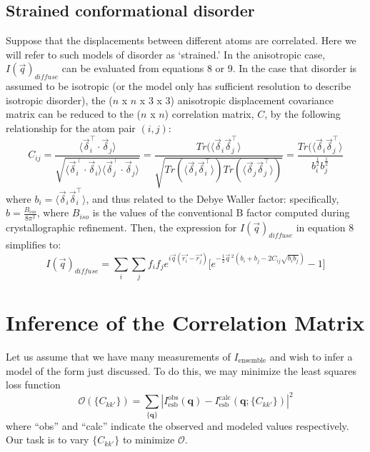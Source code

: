 \documentclass{article}
\begin{document}
\subsection{Strained conformational disorder} Suppose that the displacements between different atoms are correlated. Here we will refer to such models of disorder as `strained.' In the anisotropic case, $I(\vec{q})_{diffuse}$ can be evaluated from equations 8 or 9. In the case that disorder is assumed to be isotropic (or the model only has sufficient resolution to describe isotropic disorder), the ($n$ x $n$ x $3$ x $3$) anisotropic displacement covariance matrix can be reduced to the ($n$ x $n$) correlation matrix, $C$, by the following relationship for the atom pair $(i, j)$:
\begin{equation}
C_{ij} = \frac{ \langle \vec{\delta}_i^\intercal \cdot \vec{\delta}_j \rangle }{\sqrt{\langle \vec{\delta}_i^\intercal \cdot \vec{\delta}_i \rangle \langle \vec{\delta}_j^\intercal \cdot \vec{\delta}_j \rangle }} =\frac{Tr(\langle \vec{\delta}_i \vec{\delta}_j^\intercal \rangle}{\sqrt{Tr(\langle \vec{\delta}_i \vec{\delta}_i^\intercal \rangle)Tr(\langle \vec{\delta}_j \vec{\delta}_j^\intercal \rangle)}} = \frac{ Tr(\langle \vec{\delta}_i \vec{\delta}_j^\intercal \rangle}{b_i^{\frac{1}{2}}b_{j}^{\frac{1}{2}}}
\end{equation}
where $b_i = \langle \vec{\delta}_i \vec{\delta}_i^\intercal \rangle$, and thus related to the Debye Waller factor: specifically, $b = \frac{B_{iso}}{8\pi^2}$, where $B_{iso}$ is the values of the conventional B factor computed during crystallographic refinement. Then, the expression for $I(\vec{q})_{diffuse}$ in equation 8 simplifies to:
\begin{equation}
I(\vec{q})_{diffuse} = \sum\limits_{i}\sum\limits_{j}f_{i}f_{j}e^{i\vec{q}(\vec{r_{i}} - \vec{r_{j}})} \lbrack e^{-\frac{1}{2}\vec{q}\,^2(b_i + b_j - 2 C_{ij}\sqrt{b_i b_{j}})} - 1 \rbrack
\end{equation}

\section{Inference of the Correlation Matrix}

Let us assume that we have many measurements of $I_\mathrm{ensemble}$ and wish to infer a model of the form just discussed. To do this, we may minimize the least squares loss function
\[
\mathcal{O} ( \{ C_{kk'} \} )= \sum_{\{\mathbf{q}\}} \left| I_\mathrm{esb}^\mathrm{obs} (\mathbf{q}) 
- I_\mathrm{esb}^\mathrm{calc} (\mathbf{q}; \{ C_{kk'} \}) \right|^2
\]
where ``obs'' and ``calc'' indicate the observed and modeled values respectively. Our task is to vary $ \{ C_{kk'} \}$ to minimize $\mathcal{O}$. 
\end{document}
